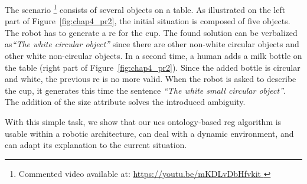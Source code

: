 The scenario \footnote{Commented video available at: \url{https://youtu.be/mKDLvDbHfvkit }} consists of several objects on a table. As illustrated on the left part of Figure~\ref{fig:chap4_pr2}, the initial situation is composed of five objects. The robot has to generate a \acrshort{re} for the cup. The found solution can be verbalized as\textit{``The white circular object''} since there are other non-white circular objects and other white non-circular objects. In a second time, a human adds a milk bottle on the table (right part of Figure~\ref{fig:chap4_pr2}). Since the added bottle is circular and white, the previous \acrshort{re} is no more valid. When the robot is asked to describe the cup, it generates this time the sentence \textit{``The white small circular object''}. The addition of the size attribute solves the introduced ambiguity.

With this simple task, we show that our \acrshort{ucs} ontology-based \acrshort{reg} algorithm is usable within a robotic architecture, can deal with a dynamic environment, and can adapt its explanation to the current situation.
